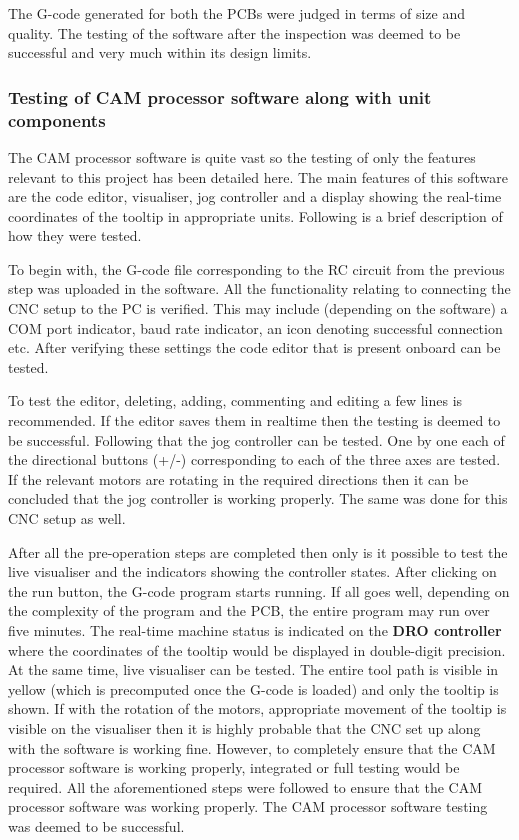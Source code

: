 The G-code generated for both the PCBs were judged in terms of size and quality. The testing of the software after the inspection was deemed to be successful and very much within its design limits.

\subsubsection*{Testing of CAM processor software along with unit components}

The CAM processor software is quite vast so the testing of only the features relevant to this project has been detailed here. The main features of this software are the code editor, visualiser, jog controller and a display showing the real-time coordinates of the tooltip in appropriate units. Following is a brief description of how they were tested. \par

To begin with, the G-code file corresponding to the RC circuit from the previous step was uploaded in the software. All the functionality relating to connecting the CNC setup to the PC is verified. This may include (depending on the software) a COM port indicator, baud rate indicator, an icon denoting successful connection etc. After verifying these settings the code editor that is present onboard can be tested. \par

To test the editor, deleting, adding, commenting and editing a few lines is recommended. If the editor saves them in realtime then the testing is deemed to be successful. Following that the jog controller can be tested. One by one each of the directional buttons (+/-) corresponding to each of the three axes are tested. If the relevant motors are rotating in the required directions then it can be concluded that the jog controller is working properly. The same was done for this CNC setup as well. \par

After all the pre-operation steps are completed then only is it possible to test the live visualiser and the indicators showing the controller states. After clicking on the run button, the G-code program starts running. If all goes well, depending on the complexity of the program and the PCB, the entire program may run over five minutes. The real-time machine status is indicated on the \textbf{DRO controller} where the coordinates of the tooltip would be displayed in double-digit precision. At the same time, live visualiser can be tested. The entire tool path is visible in yellow (which is precomputed once the G-code is loaded) and only the tooltip is shown. If with the rotation of the motors, appropriate movement of the tooltip is visible on the visualiser then it is highly probable that the CNC set up along with the software is working fine. However, to completely ensure that the CAM processor software is working properly, integrated or full testing would be required. All the aforementioned steps were followed to ensure that the CAM processor software was working properly. The CAM processor software testing was deemed to be successful.


